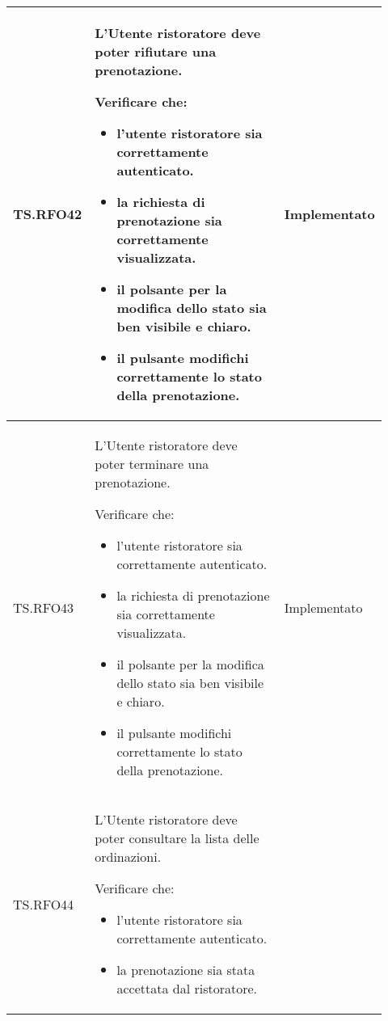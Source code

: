 \begin{longtable}{|p{0.10\linewidth}|p{0.70\linewidth}|p{0.12\linewidth}|}
	TS.RFO42                                                                                                                        &
	L'Utente ristoratore deve poter rifiutare una prenotazione. \par
	Verificare che:
	\begin{itemize}
		\item l'utente ristoratore sia correttamente autenticato.
		\item la richiesta di prenotazione sia correttamente visualizzata.
		\item il polsante per la modifica dello stato sia ben visibile e chiaro.
		\item il pulsante modifichi correttamente lo stato della prenotazione.
	\end{itemize}                                                        &
	Implementato                                                                                                                                                   \\
	\hline
	TS.RFO43                                                                                                                        &
	L'Utente ristoratore deve poter terminare una prenotazione. \par
	Verificare che:
	\begin{itemize}
		\item l'utente ristoratore sia correttamente autenticato.
		\item la richiesta di prenotazione sia correttamente visualizzata.
		\item il polsante per la modifica dello stato sia ben visibile e chiaro.
		\item il pulsante modifichi correttamente lo stato della prenotazione.
	\end{itemize}                                                        &
	Implementato                                                                                                                                                   \\
	\hline
	TS.RFO44                                                                                                                        &
	L'Utente ristoratore deve poter consultare la lista delle ordinazioni. \par
	Verificare che:
	\begin{itemize}
		\item l'utente ristoratore sia correttamente autenticato.
		\item la prenotazione sia stata accettata dal ristoratore.

\end{itemize}
\end{longtable}
